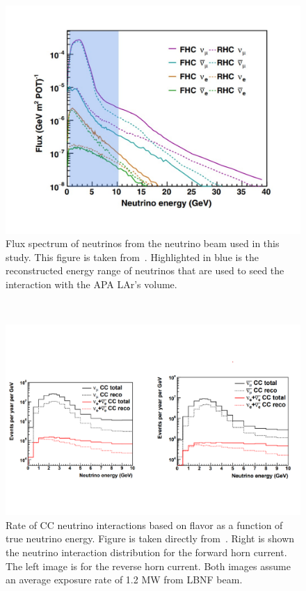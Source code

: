 \begin{figure}[]
\centering
\includegraphics[width=\textwidth]{images/dune_flux_energy_range.pdf}
\caption{Flux spectrum of neutrinos from the neutrino beam used in this study. This figure is taken from~\cite{electron_flux_image_2020}. 
Highlighted in blue is the reconstructed energy range of neutrinos that are used to seed the interaction with the APA LAr's volume.}
\end{figure}~\label{fig:neutrino_flux}

\begin{figure}[]
\centering
\includegraphics[width=\textwidth]{images/dune_cdr_2021_neutrino_flux.pdf}
\caption{Rate of CC neutrino interactions based on flavor as a function of true neutrino energy.
Figure is taken directly from~\citep{dune_2021_near_detector_cdr}.
Right is shown the neutrino interaction distribution for the forward horn current.
The left image is for the reverse horn current.
Both images assume an average exposure rate of 1.2 MW from LBNF beam.}
\end{figure}~\label{fig:neutrino_interaction_flux}


